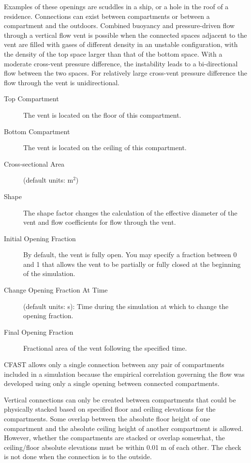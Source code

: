 Examples of these openings are scuddles in a ship, or a hole in the roof of a residence. Connections can exist between compartments or between a compartment and the outdoors. Combined buoyancy and pressure-driven flow through a vertical flow vent is possible when the connected spaces adjacent to the vent are filled with gases of different density in an unstable configuration, with the density of the top space larger than that of the bottom space. With a moderate cross-vent pressure difference, the instability leads to a bi-directional flow between the two spaces. For relatively large cross-vent pressure difference the flow through the vent is unidirectional.
\begin{description}
\item[Top Compartment] The vent is located on the floor of this compartment.
\item[Bottom Compartment] The vent is located on the ceiling of this compartment.
\item[Cross-sectional Area] (default units: m$^2$)
\item[Shape] The shape factor changes the calculation of the effective diameter of the vent and flow coefficients for flow through the vent.
\item[Initial Opening Fraction] By default, the vent is fully open. You may specify a fraction between 0 and 1 that allows the vent to be partially or fully closed at the beginning of the simulation.
\item[Change Opening Fraction At Time] (default units: s): Time during the simulation at which to change the opening fraction.
\item[Final Opening Fraction] Fractional area of the vent following the specified time.
\end{description}
CFAST allows only a single connection between any pair of compartments included in a simulation because the empirical correlation governing the flow was developed using only a single opening between connected compartments.

Vertical connections can only be created between compartments that could be physically stacked based on specified floor and ceiling elevations for the compartments.  Some overlap between the absolute floor height of one compartment and the absolute ceiling height of another compartment is allowed.  However, whether the compartments are stacked or overlap somewhat, the ceiling/floor absolute elevations must be within 0.01 m of each other. The check is not done when the connection is to the outside.


